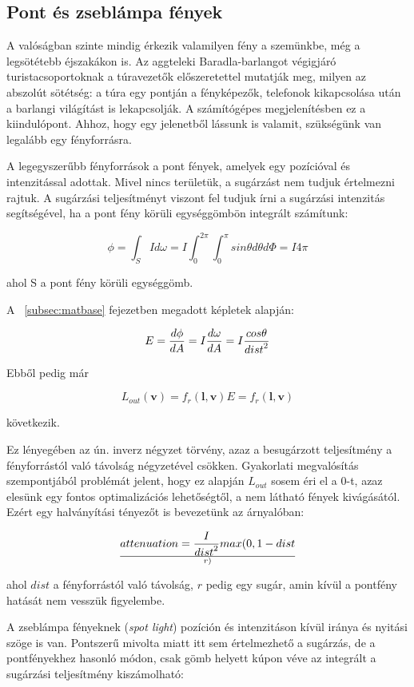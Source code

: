 \subsection{Pont és zseblámpa fények}

A valóságban szinte mindig érkezik valamilyen fény a szemünkbe, még a legsötétebb éjszakákon is. Az aggteleki Baradla-barlangot végigjáró turistacsoportoknak a túravezetők előszeretettel mutatják meg, milyen az abszolút sötétség: a túra egy pontján a fényképezők, telefonok kikapcsolása után a barlangi világítást is lekapcsolják. A számítógépes megjelenítésben ez a kiindulópont. Ahhoz, hogy egy jelenetből lássunk is valamit, szükségünk van legalább egy fényforrásra.

A legegyszerűbb fényforrások a pont fények, amelyek egy pozícióval és intenzitással adottak. Mivel nincs területük, a sugárzást nem tudjuk értelmezni rajtuk. A sugárzási teljesítményt viszont fel tudjuk írni a sugárzási intenzitás segítségével, ha a pont fény körüli egységgömbön integrált számítunk:

\[
\phi = \int_S { I d\omega } = I \int_0^{2\pi} { \int_0^\pi { sin\theta d\theta d\Phi } } = I 4\pi
\]

ahol S a pont fény körüli egységgömb.

A ~\ref{subsec:matbase} fejezetben megadott képletek alapján:

\[
E = { { d\phi } \over { dA } } = I { { d\omega } \over { dA } } = I { { cos\theta } \over { dist }^2 }
\]

Ebből pedig már

\[
L_{out}(\mathbf{v}) = f_r(\mathbf{l}, \mathbf{v}) E = f_r(\mathbf{l}, \mathbf{v}) {}
\]

következik.

Ez lényegében az ún. inverz négyzet törvény, azaz a besugárzott teljesítmény a fényforrástól való távolság négyzetével csökken. Gyakorlati megvalósítás szempontjából problémát jelent, hogy ez alapján \(L_{out}\) sosem éri el a 0-t, azaz elesünk egy fontos optimalizációs lehetőségtől, a nem látható fények kivágásától. Ezért egy halványítási tényezőt is bevezetünk az árnyalóban:

\[
attenuation = { I \over {dist}^2 } max(0, 1 - dist \over r)
\]

ahol \(dist\) a fényforrástól való távolság, \(r\) pedig egy sugár, amin kívül a pontfény hatását nem vesszük figyelembe.

A zseblámpa fényeknek (\textit{spot light}) pozíción és intenzitáson kívül iránya és nyitási szöge is van. Pontszerű mivolta miatt itt sem értelmezhető a sugárzás, de a pontfényekhez hasonló módon, csak gömb helyett kúpon véve az integrált a sugárzási teljesítmény kiszámolható:

